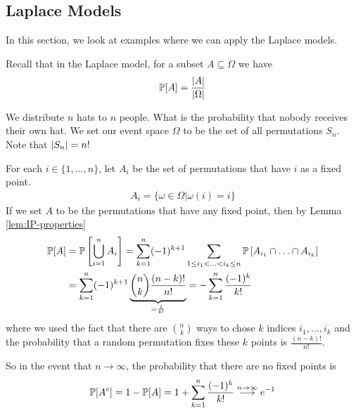 \subsection{Laplace Models}
In this section, we look at examples where we can apply the Laplace models.

Recall that in the Laplace model, for a subset $A \subseteq \Omega$ we have 
\begin{align*}
  \mathbb{P}[A] = \frac{\vert A\vert}{\vert\Omega\vert}
\end{align*}

\begin{ex}
  We distribute $n$ hats to $n$ people. What is the probability that nobody receives their own hat.
  We set our event space $\Omega$ to be the set of all permutations $S_n$. Note that $\vert S_n\vert = n!$

  For each $i \in \{1, \ldots, n\}$, let $A_i$ be the set of permutations that have $i$ as a fixed point.
  \begin{align*}
    A_i = \{\omega \in \Omega \big\vert \omega(i) = i\}
  \end{align*}
  If we set $A$ to be the permutations that have any fixed point, then by Lemma \ref{lem:IP-properties}
  \begin{align*}
    \mathbb{P}[A] 
    &= 
    \mathbb{P}\left[\bigcup_{i=1}^{n}A_i \right] 
    = \sum_{k=1}^{n} (-1)^{k+1} \sum_{1 \leq i_1< \ldots <i_k \leq n} \mathbb{P} \left[
      A_{i_1} \cap \ldots \cap A_{i_k}
    \right]\\
    &= \sum_{k=1}^{n} (-1)^{k+1} \underbrace{\binom{n}{k} \frac{(n-k)!}{n!}}_{= \frac{1}{k!}} = - \sum_{k=1}^{n} \frac{(-1)^{k}}{k!}
  \end{align*}
  where we used the fact that there are $\binom{n}{k}$ ways to chose $k$ indices $i_{1}, \ldots, i_{k}$ and the probability that a random permutation fixes these $k$ points is $\frac{(n-k)!}{n!}$.

  So in the event that $n \to \infty$, the probability that there are no fixed points is
  \begin{align*}
    \mathbb{P}[A^{c}] = 1 - \mathbb{P}[A] = 1 + \sum_{k=1}^{n} \frac{(-1)^{k}}{k!} \stackrel{n \to  \infty}{\longrightarrow} e^{-1}
  \end{align*}

\end{ex}


